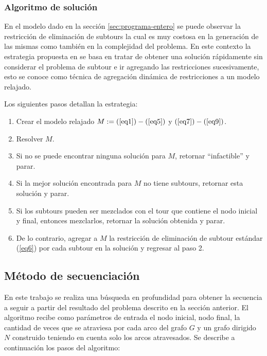 \documentclass[spanish, conference]{IEEEtran}
\begin{document}
\subsubsection{Algoritmo de solución}
\label{algoritmo-solucion}
En el modelo dado en la sección \ref{sec:programa-entero} se puede observar la restricción de eliminación de subtours la cual es muy costosa en la generación de las mismas como también en  la complejidad del problema. En este contexto la estrategia propuesta en \cite{Braier2017AnArgentina} se basa en tratar de obtener una solución rápidamente sin considerar el problema de subtour e ir agregando las restricciones sucesivamente, esto se conoce como técnica de agregación dinámica de restricciones a un modelo relajado.

Los siguientes pasos detallan la estrategia:

\begin{enumerate}
\item Crear el modelo relajado $M: = (\ref{eq1}) - (\ref{eq5})$ y $(\ref{eq7}) - (\ref{eq9})$.
\item Resolver $M$.
\item Si no se puede encontrar ninguna solución para $M$, retornar ``infactible'' y parar.
\item Si la mejor solución encontrada para $M$ no tiene subtours, retornar esta solución y parar.
\item Si los subtours pueden ser mezclados con el tour que contiene el nodo inicial y final, entonces mezclarlos, retornar la solución obtenida y parar.
\item De lo contrario, agregar a $M$ la restricción de eliminación de subtour estándar (\ref{eq6}) por cada subtour en la solución y regresar al paso 2.
\end{enumerate}

\subsection{Método de secuenciación}


En este trabajo se realiza una búsqueda en profundidad para obtener la secuencia a seguir a partir del resultado del problema descrito en la sección anterior. El algoritmo recibe como parámetros de entrada el nodo inicial, nodo final, la cantidad de veces que se atraviesa por cada arco del grafo $G$ y un grafo dirigido $N$ construido teniendo en cuenta solo los arcos atravesados. Se describe a continuación los pasos del algoritmo:
\end{document}
